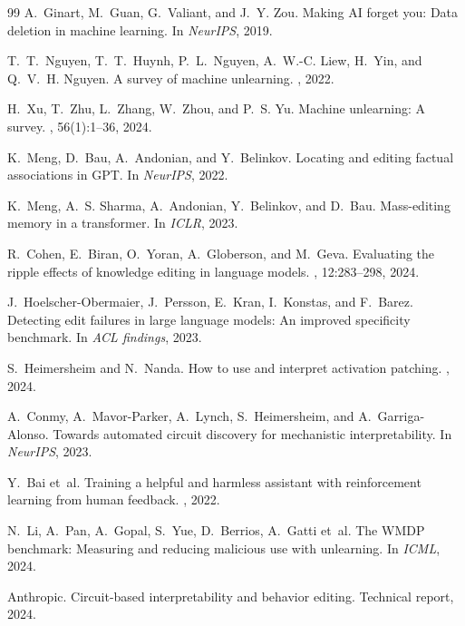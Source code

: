 \documentclass{article}
\begin{document}
\begin{thebibliography}{99}
A.~Ginart, M.~Guan, G.~Valiant, and J.~Y. Zou.
\newblock Making AI forget you: Data deletion in machine learning.
\newblock In {\em NeurIPS}, 2019.

T.~T.\ Nguyen, T.~T.\ Huynh, P.~L.\ Nguyen, A.~W.-C. Liew, H.~Yin, and
  Q.~V.~H. Nguyen.
\newblock A survey of machine unlearning.
, 2022.

H.~Xu, T.~Zhu, L.~Zhang, W.~Zhou, and P.~S. Yu.
\newblock Machine unlearning: A survey.
, 56(1):1--36, 2024.

K.~Meng, D.~Bau, A.~Andonian, and Y.~Belinkov.
\newblock Locating and editing factual associations in GPT.
\newblock In {\em NeurIPS}, 2022.

K.~Meng, A.~S. Sharma, A.~Andonian, Y.~Belinkov, and D.~Bau.
\newblock Mass-editing memory in a transformer.
\newblock In {\em ICLR}, 2023.

R.~Cohen, E.~Biran, O.~Yoran, A.~Globerson, and M.~Geva.
\newblock Evaluating the ripple effects of knowledge editing in language
  models.
, 12:283--298, 2024.

J.~Hoelscher-Obermaier, J.~Persson, E.~Kran, I.~Konstas, and F.~Barez.
\newblock Detecting edit failures in large language models: An improved
  specificity benchmark.
\newblock In {\em ACL findings}, 2023.

S.~Heimersheim and N.~Nanda.
\newblock How to use and interpret activation patching.
, 2024.

A.~Conmy, A.~Mavor-Parker, A.~Lynch, S.~Heimersheim, and A.~Garriga-Alonso.
\newblock Towards automated circuit discovery for mechanistic interpretability.
\newblock In {\em NeurIPS}, 2023.

Y.~Bai et~al.
\newblock Training a helpful and harmless assistant with reinforcement learning
  from human feedback.
, 2022.

N.~Li, A.~Pan, A.~Gopal, S.~Yue, D.~Berrios, A.~Gatti et~al.
\newblock The {WMDP} benchmark: Measuring and reducing malicious use with
  unlearning.
\newblock In {\em ICML}, 2024.

Anthropic.
\newblock Circuit-based interpretability and behavior editing.
\newblock Technical report, 2024.


\end{thebibliography}
\end{document}
